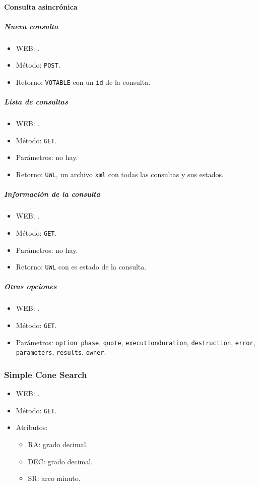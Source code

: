 \paragraph{Consulta asincrónica}

\subparagraph{Nueva consulta}

\begin{itemize}
	\item WEB: \url{}.
	\item M\'etodo: \verb;POST;.
	\item Retorno: \verb;VOTABLE; con un \verb;id; de la consulta.
\end{itemize}

\subparagraph{Lista de consultas}

\begin{itemize}
	\item WEB: \url{}.
	\item M\'etodo: \verb;GET;.
	\item Parámetros: no hay.
	\item Retorno: \verb;UWL;, un archivo \verb;xml; con todas las consultas y sus estados.
\end{itemize}

\subparagraph{Información de la consulta}

\begin{itemize}
	\item WEB: \url{}.
	\item M\'etodo: \verb;GET;.
	\item Parámetros: no hay.
	\item Retorno: \verb;UWL; con es estado de la consulta.
\end{itemize}

\subparagraph{Otras opciones}

\begin{itemize}
	\item WEB: \url{}.
	\item M\'etodo: \verb;GET;.
	\item Parámetros: \verb;option phase;, \verb;quote;, \verb;executionduration;, \verb;destruction;, \verb;error;, \verb;parameters;, \verb;results;, \verb;owner;.
\end{itemize}

\subsubsection*{{\sc Simple Cone Search}}

\begin{itemize}
	\item WEB: \url{}.
	\item M\'etodo: \verb;GET;.
	\item Atributos: 
		\begin{itemize}
			\item RA: grado decimal.
			\item DEC: grado decimal.
			\item SR: arco minuto.
		\end{itemize}
\end{itemize}

